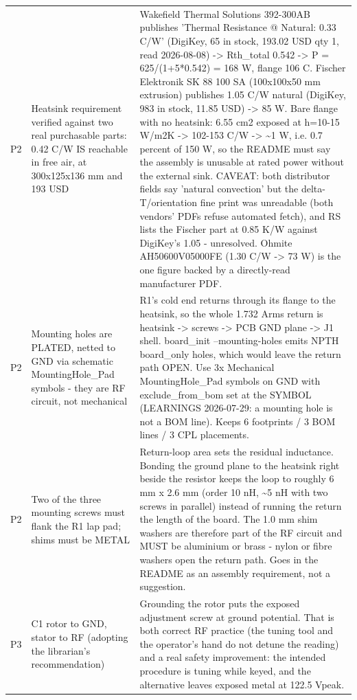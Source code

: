 \documentclass[11pt,a4paper]{article}
\begin{document}
{\begin{longtable}{lp{5.2cm}p{7.2cm}}
P2 & Heatsink requirement verified against two real purchasable parts: 0.42 C/W IS reachable in free air, at 300x125x136 mm and 193 USD & Wakefield Thermal Solutions 392-300AB publishes 'Thermal Resistance @ Natural: 0.33 C/W' (DigiKey, 65 in stock, 193.02 USD qty 1, read 2026-08-08) -\textgreater{} Rth\_total 0.542 -\textgreater{} P = 625/(1+5{*}0.542) = 168 W, flange 106 C. Fischer Elektronik SK 88 100 SA (100x100x50 mm extrusion) publishes 1.05 C/W natural (DigiKey, 983 in stock, 11.85 USD) -\textgreater{} 85 W. Bare flange with no heatsink: 6.55 cm2 exposed at h=10-15 W/m2K -\textgreater{} 102-153 C/W -\textgreater{} \textasciitilde{}1 W, i.e. 0.7 percent of 150 W, so the README must say the assembly is unusable at rated power without the external sink. CAVEAT: both distributor fields say 'natural convection' but the delta-T/orientation fine print was unreadable (both vendors' PDFs refuse automated fetch), and RS lists the Fischer part at 0.85 K/W against DigiKey's 1.05 - unresolved. Ohmite AH50600V05000FE (1.30 C/W -\textgreater{} 73 W) is the one figure backed by a directly-read manufacturer PDF. \\
P2 & Mounting holes are PLATED, netted to GND via schematic MountingHole\_Pad symbols - they are RF circuit, not mechanical & R1's cold end returns through its flange to the heatsink, so the whole 1.732 Arms return is heatsink -\textgreater{} screws -\textgreater{} PCB GND plane -\textgreater{} J1 shell. board\_init --mounting-holes emits NPTH board\_only holes, which would leave the return path OPEN. Use 3x Mechanical MountingHole\_Pad symbols on GND with exclude\_from\_bom set at the SYMBOL (LEARNINGS 2026-07-29: a mounting hole is not a BOM line). Keeps 6 footprints / 3 BOM lines / 3 CPL placements. \\
P2 & Two of the three mounting screws must flank the R1 lap pad; shims must be METAL & Return-loop area sets the residual inductance. Bonding the ground plane to the heatsink right beside the resistor keeps the loop to roughly 6 mm x 2.6 mm (order 10 nH, \textasciitilde{}5 nH with two screws in parallel) instead of running the return the length of the board. The 1.0 mm shim washers are therefore part of the RF circuit and MUST be aluminium or brass - nylon or fibre washers open the return path. Goes in the README as an assembly requirement, not a suggestion. \\
P3 & C1 rotor to GND, stator to RF (adopting the librarian's recommendation) & Grounding the rotor puts the exposed adjustment screw at ground potential. That is both correct RF practice (the tuning tool and the operator's hand do not detune the reading) and a real safety improvement: the intended procedure is tuning while keyed, and the alternative leaves exposed metal at 122.5 Vpeak. \\

\end{longtable}}
\end{document}
